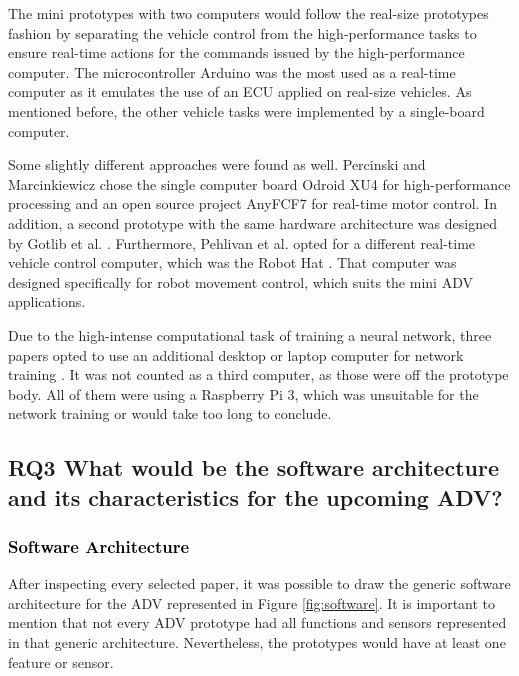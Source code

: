 \documentclass[lettersize,journal]{IEEEtran}
\begin{document}
The mini prototypes with two computers would follow the real-size prototypes fashion by separating the vehicle control from the high-performance tasks to ensure real-time actions for the commands issued by the high-performance computer. The microcontroller Arduino was the most used as a real-time computer as it emulates the use of an ECU applied on real-size vehicles. As mentioned before, the other vehicle tasks were implemented by a single-board computer.

Some slightly different approaches were found as well. Percinski and Marcinkiewicz \cite{Percinski2018} chose the single computer board Odroid XU4 \cite{odroid} for high-performance processing and an open source project AnyFCF7 \cite{ANYFCF7} for real-time motor control. In addition, a second prototype with the same hardware architecture was designed by Gotlib et al. \cite{Gotlib2019}. Furthermore, Pehlivan et al. \cite{pehlivan2020} opted for a different real-time vehicle control computer, which was the Robot Hat \cite{RobotHat}. That computer was designed specifically for robot movement control, which suits the mini ADV applications.

Due to the high-intense computational task of training a neural network, three papers opted to use an additional desktop or laptop computer for network training \cite{Bechtel2019,do2018,pehlivan2020}. It was not counted as a third computer, as those were off the prototype body. All of them were using a Raspberry Pi 3, which was unsuitable for the network training or would take too long to conclude.

\subsection{\textbf{RQ3  What would be the software architecture and its characteristics for the upcoming ADV?}}

\vspace{\baselineskip}

\subsubsection {\textcolor{black}{\textbf{Software Architecture}}}

\leavevmode\vspace{0.1\baselineskip}%

After inspecting every selected paper, it was possible to draw the generic software architecture for the ADV represented in Figure \ref{fig:software}. It is important to mention that not every ADV prototype had all functions and sensors represented in that generic architecture. Nevertheless, the prototypes would have at least one feature or sensor. 
\end{document}
